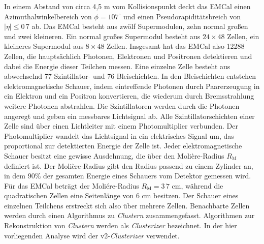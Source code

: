 In einem Abstand von circa 4,5 m vom Kollisionspunkt deckt das EMCal einen Azimuthalwinkelbereich von $\phi=107^{\circ}$ und einen Pseudorapiditätsbreich von $ |\eta| \leq 0\,7$ ab.
Das EMCal besteht aus zwölf Supermodulen, zehn normal großen und zwei kleineren.
Ein normal großes Supermodul besteht aus $24\times48$ Zellen, ein kleineres Supermodul aus $8\times48$ Zellen.
Insgesamt hat das EMCal also 12288 Zellen, die hauptsächlich Photonen, Elektronen und Positronen detektieren und dabei die Energie dieser Teilchen messen.
Eine einzelne Zelle besteht aus abwechselnd 77 Szintillator- und 76 Bleischichten.
In den Bleischichten entstehen elektromagnetische Schauer, indem eintreffende Photonen durch Paarerzeugung in ein Elektron und ein Positron konvertieren, die wiederum durch Bremsstrahlung weitere Photonen abstrahlen.
Die Szintillatoren werden durch die Photonen angeregt und geben ein messbares Lichtsignal ab.
Alle Szintillatorschichten einer Zelle sind über einen Lichtleiter mit einem Photomultiplier verbunden.
Der Photomultiplier wandelt das Lichtsignal in ein elektrisches Signal um, das proportional zur detektierten Energie der Zelle ist.
\newline
Jeder elektromagnetische Schauer besitzt eine gewisse Ausdehnung, die über den Moli\`ere-Radius $R_{\text{M}}$ definiert ist.
Der Moli\`ere-Radius gibt den Radius passend zu einem Zylinder an, in dem 90\% der gesamten Energie eines Schauers vom Detektor gemessen wird.
Für das EMCal beträgt der Moliére-Radius $R_{\text{M}} = 3\,7$ cm, während die quadratischen Zellen eine Seitenlänge von 6 cm besitzen. 
Der Schauer eines einzelnen Teilchens erstreckt sich also über mehrere Zellen.
Benachbarte Zellen werden durch einen Algorithmus zu \textit{Clustern} zusammengefasst.
Algorithmen zur Rekonstruktion von \textit{Clustern} werden als \textit{Clusterizer} bezeichnet.
In der hier vorliegenden Analyse wird der  v2-\textit{Clusterizer} verwendet.
